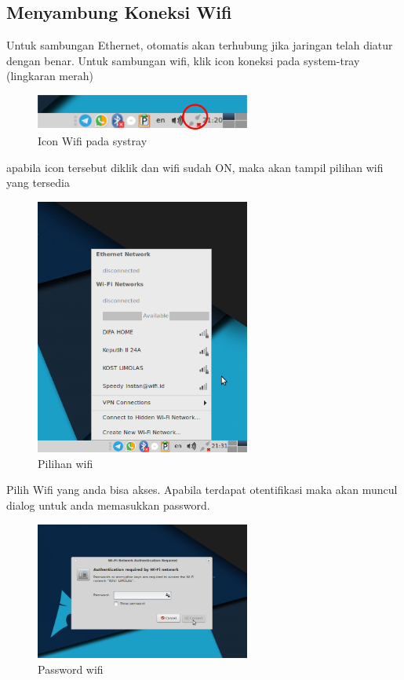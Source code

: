 \documentclass[12pt,]{article}
\begin{document}
	\newpage
	\subsection{Menyambung Koneksi Wifi}

	Untuk sambungan Ethernet, otomatis akan terhubung jika jaringan telah diatur dengan benar.
	Untuk sambungan wifi, klik icon koneksi pada system-tray (lingkaran merah)
	
	\begin{figure}[!ht]
		\centering
		\includegraphics[width=200pt]{png/systraywifi}
		\caption{Icon Wifi pada systray}
	\end{figure}

	apabila icon tersebut diklik dan wifi sudah ON, maka akan tampil pilihan wifi yang tersedia
	
	\begin{figure}[!ht]
		\centering
		\includegraphics[width=200pt]{png/wifi}
		\caption{Pilihan wifi}
	\end{figure}
	
	Pilih Wifi yang anda bisa akses. 
	Apabila terdapat otentifikasi maka akan muncul dialog untuk anda memasukkan password.
	
	\begin{figure}[!ht]
		\centering
		\includegraphics[width=200pt]{png/wifipass}
		\caption{Password wifi}
	\end{figure}
\end{document}
